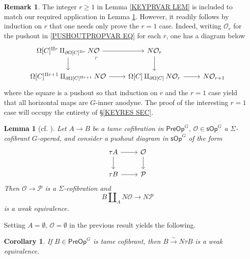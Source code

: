 \documentclass[a4paper,10pt
,draft
]{article}%
\numberwithin{equation}{section}
\numberwithin{figure}{section}
\newtheorem{lemma}[equation]{Lemma}%
\newtheorem{corollary}[equation]{Corollary}%
\theoremstyle{definition} %
\newtheorem{remark}[equation]{Remark}%
\renewcommand{\O}{\ensuremath{\mathcal O}}
\newcommand{\1}{\ensuremath{\mathbbm 1}}%
\begin{document}
\begin{remark}
	The integer $r \geq 1$ in 
	Lemma \ref{KEYPRVAR LEM}
	is included to match our required application in Lemma \ref{UNITEQUIV LEM}.
	However, it readily follows by induction on $r$ that one needs only prove the $r=1$ case.
	Indeed, writing $\O_r$ for the pushout in 
	\eqref{PUSHOUTPROPVAR EQ}
	for each $r$,
	one has a diagram below
\begin{equation}
\begin{tikzcd}
	\Omega[C]^{\amalg r} \amalg_{\partial \Omega[C]^{\amalg r}} N\mathcal{O} \ar{r} \ar{d}
	\arrow[dr, phantom, "\ulcorner", very near start] 
&
	N \mathcal{O}_r \ar{d}
\\
	\Omega[C]^{\amalg r+1} \amalg_{ \partial \Omega[C]^{\amalg r+1}} N \mathcal{O} \ar{r}
&
	\Omega[C] \amalg_{\partial \Omega[C]} N \mathcal{O}_r \ar{r}
&
	N \mathcal{O}_{r+1}
\end{tikzcd}
\end{equation}
	where the square is a pushout so that induction on $r$ and the $r=1$ case yield that all horizontal maps
	are $G$-inner anodyne.
	The proof of the interesting $r=1$ case will occupy the entirety of \S \ref{KEYRES SEC}.
\end{remark}





\begin{lemma}[{cf. \cite[Lemma 8.2]{CM13b}}]
	\label{UNITEQUIV LEM}
	Let $A \to B$ be a tame cofibration in $\mathsf{PreOp}^G$, 
	$\mathcal{O} \in \mathsf{sOp}^G$ a $\Sigma$-cofibrant 
	$G$-operad,
	and consider a pushout diagram in $\mathsf{sOp}^G$ of the form
\begin{equation}\label{THEPUSH EQ}
\begin{tikzcd}
	\tau A \ar{r} \ar{d} & \mathcal{O} \ar{d}
\\
	\tau B \ar{r} & \mathcal{P}
\end{tikzcd}
\end{equation}
	Then $\mathcal{O} \to \mathcal{P}$ is a $\Sigma$-cofibration and 
	\begin{equation}\label{UNITEQUIV EQ}
	B \amalg_{A} N \mathcal{O}
	\to 
	N \mathcal{P}
	\end{equation}
	is a weak equivalence.
\end{lemma}

Setting $A = \emptyset $, $\mathcal{O}= \emptyset$ in the previous result yields the following.

\begin{corollary}\label{KEYEQUIV COR}
	If $B \in \mathsf{PreOp}^G$ is tame cofibrant, then 
	$B \xrightarrow{\sim} N \tau B$ is a weak equivalence.
\end{corollary}
\end{document}
